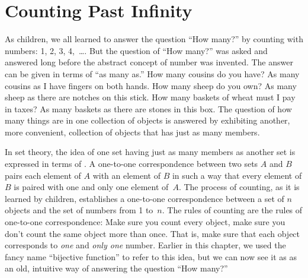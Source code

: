 \section{Counting Past Infinity}\label{S-sets-6}

As children, we all learned to answer the question ``How many?''
by counting with numbers: 1, 2, 3, 4,~\dots.  But the question of
``How many?'' was asked and answered long before the abstract concept of
number was invented.  The answer can be given in terms of ``as many as.''
How many cousins do you have?  As many cousins as I have fingers on both
hands.  How many sheep do you own?  As many sheep as there are notches
on this stick.  How many baskets of wheat must I pay in taxes?
As many baskets as there are stones in this box.  The question
of how many things are in one collection of objects is answered
by exhibiting another, more convenient, collection of objects
that has just as many members.  

In set theory, the idea of one set having just as many members
as another set is expressed in terms of .  A one-to-one correspondence between two sets
$A$ and $B$ pairs each element of $A$ with an element of $B$
in such a way that every element of $B$ is paired with one and
only one element of~$A$.  The process of counting, as it is learned
by children, establishes a one-to-one correspondence between a set of 
$n$ objects and the set of numbers from 1 to~$n$.  The rules
of counting are the rules of one-to-one correspondence:
Make sure you count every object, make sure you don't count
the same object more than once.  That is, make sure that
each object corresponds to \emph{one} and \emph{only one} number.
Earlier in this chapter,
we used the fancy name ``bijective function''
to refer to this idea, but we can now see it as
as an old, intuitive way of answering the question ``How many?''

\medbreak

